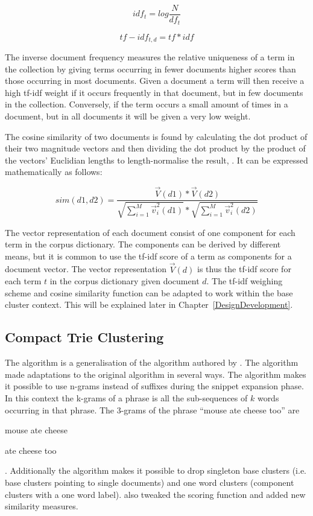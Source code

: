 \begin{displaymath}
idf_{t} = log \frac{N}{df_{t}} 
\end{displaymath}

\begin{displaymath}
tf-idf_{t,d} = tf * idf
\end{displaymath}

The inverse document frequency measures the relative uniqueness of a term in the collection by giving terms occurring in fewer documents higher scores than those occurring in most documents. Given a document a term will then receive a high tf-idf weight if it occurs frequently in that document, but in few documents in the collection. Conversely, if the term occurs a small amount of times in a document, but in all documents it will be given a very low weight.

The cosine similarity of two documents is found by calculating the dot product of their two magnitude vectors and then dividing the dot product by the product of the vectors' Euclidian lengths to length-normalise the result, \parencite{Manning2009a}. It can be expressed mathematically as follows:

\begin{displaymath}
sim(d1, d2) = \frac{\vec{V}(d1) * \vec{V}(d2)}
{\sqrt{\sum_{i = 1}^M\vec{v}_{i}^2(d1)} * \sqrt{\sum_{i = 1}^M\vec{v}_{i}^2(d2)}}
\end{displaymath}

The vector representation of each document consist of one component for each term in the corpus dictionary. The components can be derived by different means, but it is common to use the tf-idf score of a term as components for a document vector. The vector representation \(\vec{V}(d)\) is thus the tf-idf score for each term \(t\) in the corpus dictionary given document \(d\). The tf-idf weighing scheme and cosine similarity function can be adapted to work within the base cluster context. This will be explained later in Chapter~\ref{DesignDevelopment}.

\subsection{Compact Trie Clustering}
The \CTC algorithm is a generalisation of the \STC algorithm authored by \cite{Moe2014}. The \CTC algorithm made adaptations to the original \STC algorithm in several ways. The \CTC algorithm makes it possible to use n-grams instead of suffixes during the snippet expansion phase. In this context the k-grams of a phrase is all the sub-sequences of \(k\) words occurring in that phrase. The 3-grams of the phrase ``mouse ate cheese too'' are
\begin{inparaenum}[(1)] 
    \item mouse ate cheese
    \item ate cheese too
\end{inparaenum}. Additionally the \CTC algorithm makes it possible to drop singleton base clusters (i.e. base clusters pointing to single documents) and one word clusters (component clusters with a one word label). \cite{Moe2014} also tweaked the scoring function and added new similarity measures.

